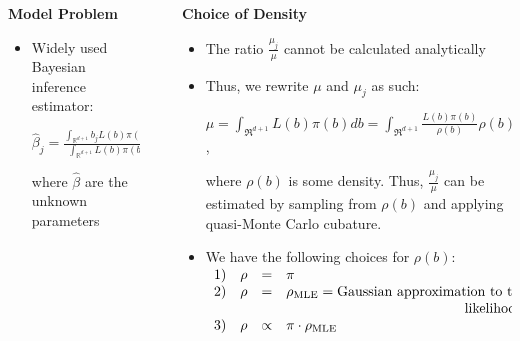 \documentclass[final,mathserif]{beamer}
\newcommand{\blue}[1]{{\color{myblue}#1}}
\renewcommand{\blue}{\textcolor{blue!80!black}}
\begin{document}
\begin{frame}[fragile]
\begin{columns}[t]
\begin{column}{.31\linewidth}
\begin{block}{\Large \textbf{\blue {Model Problem}}}
\begin{itemize}
\vspace{.05in}

\item Widely used Bayesian inference estimator:

\vspace{.05in}

 $\hat{\beta}_j=\frac{\int_{\mathbb{R}^{d+1}}b_jL(b)\pi(b)db}{\int_{\mathbb{R}^{d+1}}L(b)\pi(b)db} =: \frac{\mu_j}{\mu}, ~for\ j=0, 1, 2,\ldots, d$

\vspace{0.05in} 

where $\hat{\beta}$ are the unknown parameters
\end{itemize}
\end{block}

\end{column}


\begin{column}{.015\linewidth} \end{column} %

\begin{column}{.31\linewidth}

\begin{block}{\Large \textbf{\blue {Choice of Density}}}
\vspace{.1in}
\begin{itemize}
\item The ratio $\frac{\mu_j}{\mu}$ cannot be calculated analytically

\item Thus, we rewrite $\mu$ and $\mu_j$  as such: 

\vspace{.1in}

$\mu=\int_{\Re^{d+1}}L(b)\pi(b)db=\int_{\Re^{d+1}}\frac{L(b)\pi(b)}{\rho(b)}\rho(b)db$,

\vspace{.1in}

where $\rho(b)$ is some density.  Thus, $\frac{\mu_j}{\mu}$ can be estimated by sampling from $\rho(b)$ and applying quasi-Monte Carlo cubature.
\item  We have the following choices for $\rho(b)$:
$\begin{array}{rrcl}
1) & \rho & = & \pi \\
2) & \rho & = & \rho_{\text{MLE}} = \text{Gaussian approximation to the}\\ 
&&&\hspace{4.5cm} \text{likelihood}\\
3) & \rho & \propto & \pi \cdot \rho_{\text{MLE}}
\end{array}$


\end{itemize}
\end{block}
\end{column}
\end{columns}
\end{frame}
\end{document}
